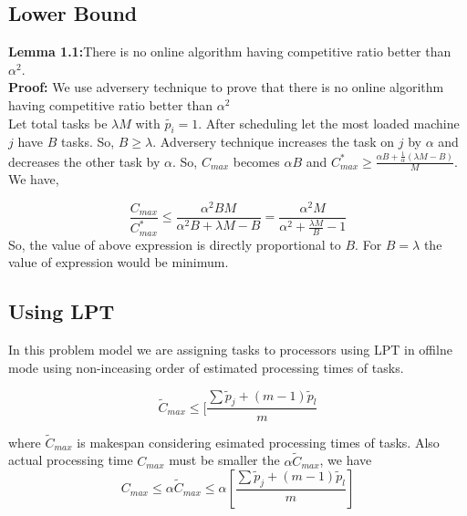 \documentclass[10pt, conference, compsocconf]{IEEEtran}
\begin{document}
                                                                                      
\subsection{Lower Bound}
\textbf{Lemma 1.1:}There is no online algorithm having competitive  ratio better than $\alpha^{2} $.\\
\textbf{Proof:} We  use adversery technique to prove that there is no online algorithm having competitive  ratio better than $\alpha^{2} $\\
 
 Let total tasks be $\lambda M$ with $\tilde{p_i}=1$. After scheduling let the most loaded machine $j$ have $B$ tasks. So, $B \geq \lambda$. Adversery technique increases the task on $j$ by $\alpha$ and decreases the other task by $\alpha$. So, $ C_{max}$ becomes $\alpha B$ and ${C^{*}_{max}}\geq \frac{\alpha B + \frac{1}{\alpha }  (\lambda  M - B) }{M}$. We have,
 
 \begin{equation}\nonumber
\frac{C_{max}}{C^{*}_{max}}\leq \frac{\alpha^{2} B M }{\alpha^{2} B + \lambda M - B}=\frac{\alpha^{2}  M }{\alpha^{2}  + \frac{\lambda M}{B}  - 1}
 \end{equation} 
 So, the value of above expression is directly proportional to $B$. For $B= \lambda$ the value of expression would be minimum. 
 
 
\subsection{Using LPT}

In this problem model we are assigning tasks to processors using LPT in offilne mode using non-inceasing order of estimated processing times of tasks.

 


 
\begin{equation}
\tilde C_{max}\leq  [\frac{\sum{\tilde p_j + (m-1) \tilde p_l} }{m}
\end{equation}

where $\tilde C_{max}$ is makespan considering esimated processing  times  of tasks.  Also actual processing time  $C_{max}$ must be smaller the $\alpha\tilde C_{max}$, we have \\

\begin{equation}
 C_{max}\leq \alpha \tilde C_{max}\leq \alpha [\frac{\sum{\tilde p_j + (m-1) \tilde p_l} }{m}] 
\end{equation} 
\end{document}
